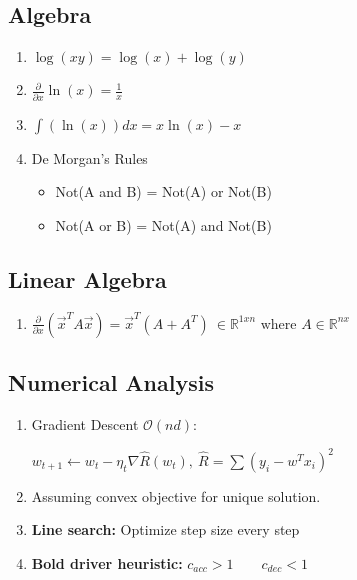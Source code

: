 \documentclass[8pt,a4paper]{scrartcl}
\newcommand{\Argmin}[2]{\text{arg}\underset{#1}{\min}\left(#2\right)}
\begin{document}
\begin{multicols*}{3}
\subsection*{Algebra}
\begin{enumerate}
\ncompaq
\item $\log(xy)=\log(x)+\log(y)$
\item $\frac{\partial }{\partial x}\ln(x)=\frac{1}{x}$
\item $\int(\ln(x))dx=x\ln(x)-x$
\item De Morgan's Rules
\begin{itemize}
\ncompaq
\item Not(A and B) = Not(A) or Not(B)
\item Not(A or B) = Not(A) and Not(B)
\end{itemize}
\end{enumerate}

\subsection*{Linear Algebra}

\begin{enumerate}
\ncompaq
\item $\frac{\partial}{\partial x}(\vec{x}^TA\vec{x})=\vec{x}^T(A+A^T)\ \in\mathbb{R}^{1xn}\text{ where }A\in\mathbb{R}^{nx}$
\end{enumerate}

\subsection*{Numerical Analysis}

\begin{enumerate}
\ncompaq
\item Gradient Descent $\mathcal{O}(nd)$: 

$w_{t+1}\leftarrow w_t-\eta_t\nabla \hat{R}(w_t),\ \hat{R}=\sum(y_i-w^Tx_i)^2$
\item Assuming convex objective for unique solution.
\item \textbf{Line search:} Optimize step size every step

\important{$\eta_t\leftarrow\Argmin{\eta\in\mathbb{R}}{\hat{R}(\vec{w}_t)-\eta\nabla\hat{R}(\vec{w}_t)}$}

\item \textbf{Bold driver heuristic:} $c_{acc}>1\qquad c_{dec}<1$
\end{enumerate}


\end{multicols*}
\end{document}
